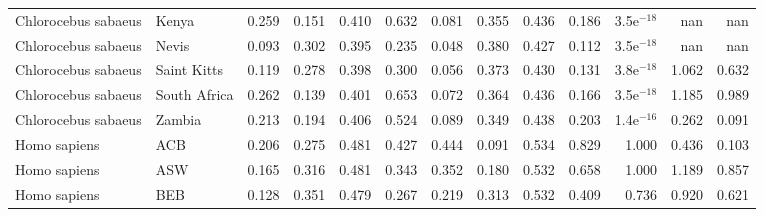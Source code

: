 \begin{longtable}{llrrrrrrrrrrr}
 Chlorocebus sabaeus &                     Kenya &                              0.259 &                               0.151 &                 0.410 &                 0.632 &                              0.081 &                               0.355 &                 0.436 &                 0.186 & 3.5e$^{-18}$ &    nan &    nan \\
 Chlorocebus sabaeus &                     Nevis &                              0.093 &                               0.302 &                 0.395 &                 0.235 &                              0.048 &                               0.380 &                 0.427 &                 0.112 & 3.5e$^{-18}$ &    nan &    nan \\
 Chlorocebus sabaeus &               Saint Kitts &                              0.119 &                               0.278 &                 0.398 &                 0.300 &                              0.056 &                               0.373 &                 0.430 &                 0.131 & 3.8e$^{-18}$ &  1.062 &  0.632 \\
 Chlorocebus sabaeus &              South Africa &                              0.262 &                               0.139 &                 0.401 &                 0.653 &                              0.072 &                               0.364 &                 0.436 &                 0.166 & 3.5e$^{-18}$ &  1.185 &  0.989 \\
 Chlorocebus sabaeus &                    Zambia &                              0.213 &                               0.194 &                 0.406 &                 0.524 &                              0.089 &                               0.349 &                 0.438 &                 0.203 & 1.4e$^{-16}$ &  0.262 &  0.091 \\
        Homo sapiens &                       ACB &                              0.206 &                               0.275 &                 0.481 &                 0.427 &                              0.444 &                               0.091 &                 0.534 &                 0.829 &        1.000 &  0.436 &  0.103 \\
        Homo sapiens &                       ASW &                              0.165 &                               0.316 &                 0.481 &                 0.343 &                              0.352 &                               0.180 &                 0.532 &                 0.658 &        1.000 &  1.189 &  0.857 \\
        Homo sapiens &                       BEB &                              0.128 &                               0.351 &                 0.479 &                 0.267 &                              0.219 &                               0.313 &                 0.532 &                 0.409 &        0.736 &  0.920 &  0.621 \\

\end{longtable}
